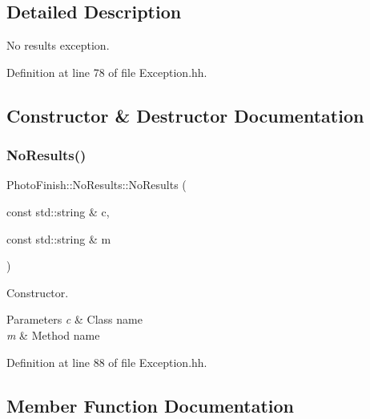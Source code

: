 \subsection{Detailed Description}
No results exception. 

Definition at line 78 of file Exception.\+hh.



\subsection{Constructor \& Destructor Documentation}
\mbox{\label{class_photo_finish_1_1_no_results_ac6abdb646f26fd45755bbf2e75a9136d}} 
\subsubsection{\texorpdfstring{No\+Results()}{NoResults()}}
{\footnotesize\ttfamily Photo\+Finish\+::\+No\+Results\+::\+No\+Results (\begin{DoxyParamCaption}\item[{const std\+::string \&}]{c,  }\item[{const std\+::string \&}]{m }\end{DoxyParamCaption})\hspace{0.3cm}{\ttfamily [inline]}}



Constructor. 


\begin{DoxyParams}{Parameters}
{\em c} & Class name \\
\hline
{\em m} & Method name \\
\hline
\end{DoxyParams}


Definition at line 88 of file Exception.\+hh.



\subsection{Member Function Documentation}
\mbox{\label{class_photo_finish_1_1_no_results_a60f0f1cdad7e5b8eab478e03cc537270}} 
